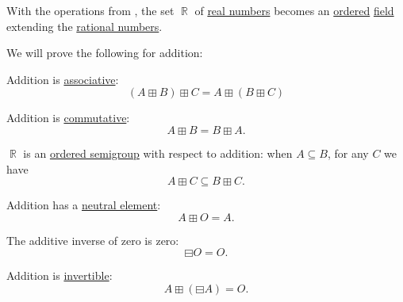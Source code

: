 \begin{proposition}\label{thm:field_of_real_numbers}
  With the operations from , the set \( \BbbR \) of \hyperref[def:real_numbers]{real numbers} becomes an \hyperref[def:ordered_semiring]{ordered} \hyperref[def:field]{field} extending the \hyperref[def:rational_numbers]{rational numbers}.

  We will prove the following for addition:
  \begin{thmenum}[series=thm:field_of_real_numbers]
     Addition is \hyperref[def:binary_operation/associative]{associative}:
    \begin{equation}\label{eq:thm:field_of_real_numbers/addition_associative}
      (A \boxplus B) \boxplus C = A \boxplus (B \boxplus C)
    \end{equation}

     Addition is \hyperref[def:binary_operation/commutative]{commutative}:
    \begin{equation}\label{eq:thm:field_of_real_numbers/addition_commutative}
      A \boxplus B = B \boxplus A.
    \end{equation}

     \( \BbbR \) is an \hyperref[def:ordered_semigroup]{ordered semigroup} with respect to addition: when \( A \subseteq B \), for any \( C \) we have
    \begin{equation}\label{eq:thm:field_of_real_numbers/addition_order}
      A \boxplus C \subseteq B \boxplus C.
    \end{equation}

     Addition has a \hyperref[def:monoid]{neutral element}:
    \begin{equation}\label{eq:thm:field_of_real_numbers/addition_neutral}
      A \boxplus O = A.
    \end{equation}

     The additive inverse of zero is zero:
    \begin{equation}\label{eq:thm:field_of_real_numbers/zero_additive_inverse}
      \boxminus O = O.
    \end{equation}

     Addition is \hyperref[def:monoid_inverse]{invertible}:
    \begin{equation}\label{eq:thm:field_of_real_numbers/addition_inverse}
      A \boxplus (\boxminus A) = O.
    \end{equation}


\end{thmenum}
\end{proposition}
